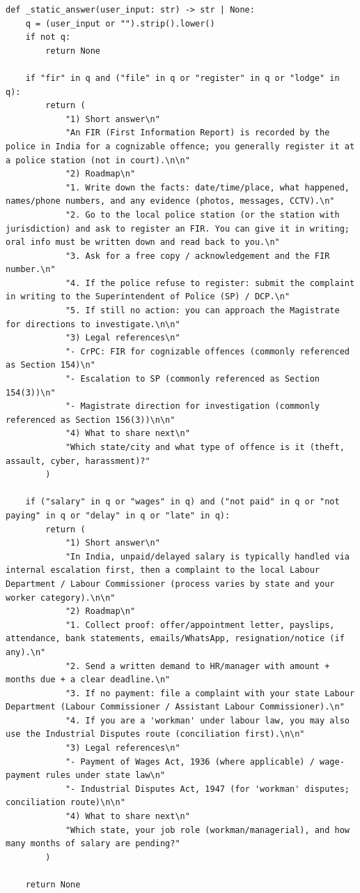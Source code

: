\documentclass[11pt,a4paper]{article}
\begin{document}
\begin{lstlisting}
def _static_answer(user_input: str) -> str | None:
    q = (user_input or "").strip().lower()
    if not q:
        return None

    if "fir" in q and ("file" in q or "register" in q or "lodge" in q):
        return (
            "1) Short answer\n"
            "An FIR (First Information Report) is recorded by the police in India for a cognizable offence; you generally register it at a police station (not in court).\n\n"
            "2) Roadmap\n"
            "1. Write down the facts: date/time/place, what happened, names/phone numbers, and any evidence (photos, messages, CCTV).\n"
            "2. Go to the local police station (or the station with jurisdiction) and ask to register an FIR. You can give it in writing; oral info must be written down and read back to you.\n"
            "3. Ask for a free copy / acknowledgement and the FIR number.\n"
            "4. If the police refuse to register: submit the complaint in writing to the Superintendent of Police (SP) / DCP.\n"
            "5. If still no action: you can approach the Magistrate for directions to investigate.\n\n"
            "3) Legal references\n"
            "- CrPC: FIR for cognizable offences (commonly referenced as Section 154)\n"
            "- Escalation to SP (commonly referenced as Section 154(3))\n"
            "- Magistrate direction for investigation (commonly referenced as Section 156(3))\n\n"
            "4) What to share next\n"
            "Which state/city and what type of offence is it (theft, assault, cyber, harassment)?"
        )

    if ("salary" in q or "wages" in q) and ("not paid" in q or "not paying" in q or "delay" in q or "late" in q):
        return (
            "1) Short answer\n"
            "In India, unpaid/delayed salary is typically handled via internal escalation first, then a complaint to the local Labour Department / Labour Commissioner (process varies by state and your worker category).\n\n"
            "2) Roadmap\n"
            "1. Collect proof: offer/appointment letter, payslips, attendance, bank statements, emails/WhatsApp, resignation/notice (if any).\n"
            "2. Send a written demand to HR/manager with amount + months due + a clear deadline.\n"
            "3. If no payment: file a complaint with your state Labour Department (Labour Commissioner / Assistant Labour Commissioner).\n"
            "4. If you are a 'workman' under labour law, you may also use the Industrial Disputes route (conciliation first).\n\n"
            "3) Legal references\n"
            "- Payment of Wages Act, 1936 (where applicable) / wage-payment rules under state law\n"
            "- Industrial Disputes Act, 1947 (for 'workman' disputes; conciliation route)\n\n"
            "4) What to share next\n"
            "Which state, your job role (workman/managerial), and how many months of salary are pending?"
        )

    return None
\end{lstlisting}
\end{document}
